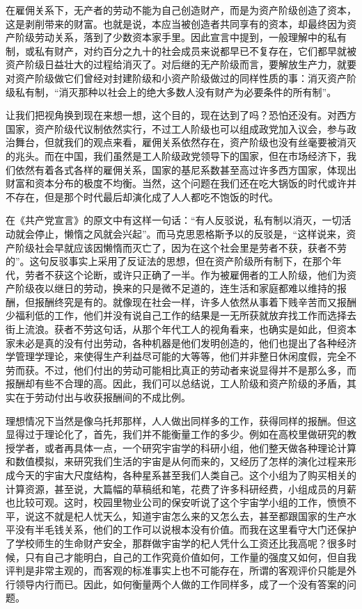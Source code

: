 \documentclass[a4paper,11pt]{ctexart}
\begin{document}
在雇佣关系下，无产者的劳动不能为自己创造财产，而是为资产阶级创造了资本，这是剥削带来的财富。也就是说，本应当被创造者共同享有的资本，却最终因为资产阶级劳动关系，落到了少数资本家手里。因此宣言中提到，一般理解中的私有制，或私有财产，对约百分之九十的社会成员来说都早已不复存在，它们都早就被资产阶级日益壮大的过程给消灭了。对后继的无产阶级而言，要解放生产力，就要对资产阶级做它们曾经对封建阶级和小资产阶级做过的同样性质的事：消灭资产阶级私有制，“消灭那种以社会上的绝大多数人没有财产为必要条件的所有制”。\par
让我们把视角换到现在来想一想，这个目的，现在达到了吗？恐怕还没有。对西方国家，资产阶级代议制依然实行，不过工人阶级也可以组成政党加入议会，参与政治舞台，但就我们的观点来看，雇佣关系依然存在，资产阶级也没有丝毫要被消灭的兆头。而在中国，我们虽然是工人阶级政党领导下的国家，但在市场经济下，我们依然有着各式各样的雇佣关系，国家的基尼系数甚至高过许多西方国家，体现出财富和资本分布的极度不均衡。当然，这个问题在我们还在吃大锅饭的时代或许并不存在，但是那个时代最后却演化成了人人都吃不饱饭的时代。\par
在《共产党宣言》的原文中有这样一句话：“有人反驳说，私有制以消灭，一切活动就会停止，懒惰之风就会兴起”。而马克思恩格斯予以的反驳是，“这样说来，资产阶级社会早就应该因懒惰而灭亡了，因为在这个社会里是劳者不获，获者不劳的”。这句反驳事实上采用了反证法的思想，但在资产阶级所有制下，在那个年代，劳者不获这个论断，或许只正确了一半。作为被雇佣者的工人阶级，他们为资产阶级夜以继日的劳动，换来的只是微不足道的，连生活和家庭都难以维持的报酬，但报酬终究是有的。就像现在社会一样，许多人依然从事着下贱辛苦而又报酬少福利低的工作，他们并没有说自己工作的结果是一无所获就放弃找工作而选择去街上流浪。获者不劳这句话，从那个年代工人的视角看来，也确实是如此，但资本家未必是真的没有付出劳动，各种机器是他们发明创造的，他们也提出了各种经济学管理学理论，来使得生产利益尽可能的大等等，他们并非整日休闲度假，完全不劳而获。不过，他们付出的劳动可能相比真正的劳动者来说显得并不是那么多，而报酬却有些不合理的高。因此，我们可以总结说，工人阶级和资产阶级的矛盾，其实在于劳动付出与收获报酬间的不成比例。\par
理想情况下当然是像乌托邦那样，人人做出同样多的工作，获得同样的报酬。但这显得过于理论化了，首先，我们并不能衡量工作的多少。例如在高校里做研究的教授学者，或者再具体一点，一个研究宇宙学的科研小组，他们整天做各种理论计算和数值模拟，来研究我们生活的宇宙是从何而来的，又经历了怎样的演化过程来形成今天的宇宙大尺度结构，各种星系甚至我们人类自己。这个小组为了购买相关的计算资源，甚至说，大篇幅的草稿纸和笔，花费了许多科研经费，小组成员的月薪也比较可观。这时，校园里物业公司的保安听说了这个宇宙学小组的工作，愤愤不平，说这不就是杞人忧天么，知道宇宙怎么来的又怎么去，甚至都跟国家的生产水平没有半毛钱关系，他们的工作可以说根本没有价值。而我在这里看守大门还保护了学校师生的生命财产安全，那群做宇宙学的杞人凭什么工资还比我高呢？很多时候，只有自己才能明白，自己的工作究竟价值如何，工作量的强度又如何，但自我评判是非常主观的，而客观的标准事实上也不可能存在，所谓的客观评价只能是外行领导内行而已。因此，如何衡量两个人做的工作同样多，成了一个没有答案的问题。\par
\end{document}
